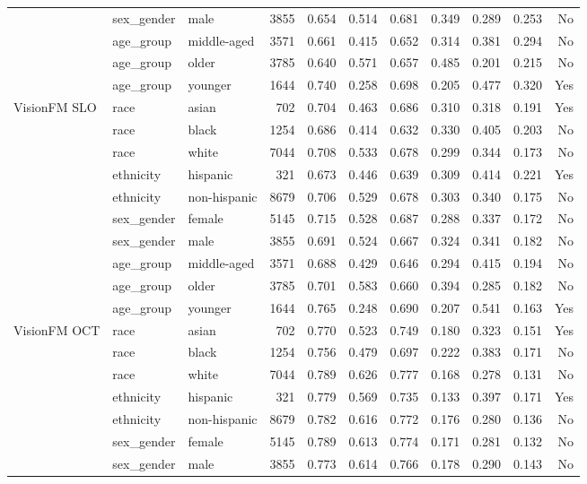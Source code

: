 \begin{longtable}{@{}lllrrrrrrrr@{}}
 & sex\_gender & male & 3855 & 0.654 & 0.514 & 0.681 & 0.349 & 0.289 & 0.253 & No \\
 & age\_group & middle-aged & 3571 & 0.661 & 0.415 & 0.652 & 0.314 & 0.381 & 0.294 & No \\
 & age\_group & older & 3785 & 0.640 & 0.571 & 0.657 & 0.485 & 0.201 & 0.215 & No \\
 & age\_group & younger & 1644 & 0.740 & 0.258 & 0.698 & 0.205 & 0.477 & 0.320 & Yes \\
VisionFM SLO & race & asian & 702 & 0.704 & 0.463 & 0.686 & 0.310 & 0.318 & 0.191 & Yes \\
 & race & black & 1254 & 0.686 & 0.414 & 0.632 & 0.330 & 0.405 & 0.203 & No \\
 & race & white & 7044 & 0.708 & 0.533 & 0.678 & 0.299 & 0.344 & 0.173 & No \\
 & ethnicity & hispanic & 321 & 0.673 & 0.446 & 0.639 & 0.309 & 0.414 & 0.221 & Yes \\
 & ethnicity & non-hispanic & 8679 & 0.706 & 0.529 & 0.678 & 0.303 & 0.340 & 0.175 & No \\
 & sex\_gender & female & 5145 & 0.715 & 0.528 & 0.687 & 0.288 & 0.337 & 0.172 & No \\
 & sex\_gender & male & 3855 & 0.691 & 0.524 & 0.667 & 0.324 & 0.341 & 0.182 & No \\
 & age\_group & middle-aged & 3571 & 0.688 & 0.429 & 0.646 & 0.294 & 0.415 & 0.194 & No \\
 & age\_group & older & 3785 & 0.701 & 0.583 & 0.660 & 0.394 & 0.285 & 0.182 & No \\
 & age\_group & younger & 1644 & 0.765 & 0.248 & 0.690 & 0.207 & 0.541 & 0.163 & Yes \\
VisionFM OCT & race & asian & 702 & 0.770 & 0.523 & 0.749 & 0.180 & 0.323 & 0.151 & Yes \\
 & race & black & 1254 & 0.756 & 0.479 & 0.697 & 0.222 & 0.383 & 0.171 & No \\
 & race & white & 7044 & 0.789 & 0.626 & 0.777 & 0.168 & 0.278 & 0.131 & No \\
 & ethnicity & hispanic & 321 & 0.779 & 0.569 & 0.735 & 0.133 & 0.397 & 0.171 & Yes \\
 & ethnicity & non-hispanic & 8679 & 0.782 & 0.616 & 0.772 & 0.176 & 0.280 & 0.136 & No \\
 & sex\_gender & female & 5145 & 0.789 & 0.613 & 0.774 & 0.171 & 0.281 & 0.132 & No \\
 & sex\_gender & male & 3855 & 0.773 & 0.614 & 0.766 & 0.178 & 0.290 & 0.143 & No \\

\end{longtable}
